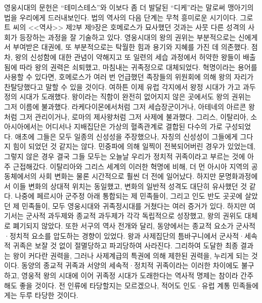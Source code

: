 영웅시대의 문헌은 ``테미스테스''와 이보다 좀 더 발달된 ``디케''라는 말로써
맹아기의 법을 우리에게 드러내보인다.
법의 역사의 다음 단계는 무척 흥미로운 시기이다.
그로트 씨의 <<역사>> 제2부 제9장은 호메로스가 묘사했던 것과는
사뭇 다른 성격의 사회가 등장하는 과정을 잘 기술하고 있다.
영웅시대의 왕의 권위는 부분적으로는 신에게서 부여받은 대권에,
또 부분적으로는 탁월한 힘과 용기와 지혜를 가진 데 의존했다.
점차, 왕의 신성함에 대한 관념이 약해지고 또
일련의 세습 과정에서 허약한 왕들이 배출됨에 따라
왕의 권력은 쇠퇴했고, 마침내는 귀족정으로 대체되었다.
혁명이라는 용어를 사용할 수 있다면,
호메로스가 여러 번 언급했던 족장들의 위원회에 의해
왕의 자리가 찬탈당했다고 말할 수 있을 것이다.
여하튼 이제 유럽 각지에서 왕정 시대가 가고 과두정의 시대가 도래했다.
왕이라는 직함이 완전히 없어지지 않은 곳에서도 왕의 권위는 그저
이름에 불과했다.
라케다이몬에서처럼 그저 세습장군이거나,
아테네의 아르콘 왕처럼 그저 관리이거나,
로마의 제사왕처럼
그저 사제에 불과했다.
그리스, 이탈리아, 소아시아에서는 어디서나
지배집단은 가상의 혈족관계로 결합된 다수의 가로
구성되었다.
애초에 그들은 모두 일종의 신성성을 주장했으나,
자칭의 신성성이 그들에게 그다지 힘이 되었던 것 같지는 않다.
민중파에 의해 일찍이 전복되어버린 경우가 있었는데,
그렇지 않은 경우 결국 그들 모두는
오늘날 우리가 정치적 귀족이라고 부르는 것에 아주 근접해갔다.
이탈리아와 그리스 세계의 이러한 혁명에 비해,
더 먼 아시아 지역의 공동체에서의 사회 변화는
물론 시간적으로 훨씬 더 전에 일어났다.
하지만 문명화과정에서 이들 변화의 상대적 위치는 동일했고,
변화의 일반적 성격도 대단히 유사했던 것 같다.
나중에 페르시아 군주정 아래 통합되는 제 민족들이,
그리고 인도 반도 곳곳에 살았던 제 민족들이,
모두 영웅시대와 귀족정시대를 거쳤다는 여러 증거가 있다.
하지만 여기서는 군사적 과두제와 종교적 과두제가 각각 독립적으로 성장했고,
왕의 권위도 대체로 폐기되지 않았다.
또한 서구의 역사 전개와 달리, 동양에서는
종교적 요소가 군사적^^b7정치적 요소를 압도하는 경향이 있었다.
왕과 사제집단의 틈바구니에서 군사적^^b7세속적 귀족은 보잘 것 없이
절멸당하고 파괴당하여 사라진다.
그리하여 도달한 최종 결과는
왕이 커다란 권력을, 그러나 사제계급의 특권에 의해 제한된 권력을,
누리게 되는 것이다.
동양의 종교적 귀족과 서양의 세속적^^b7정치적 귀족이라는
이러한 차이에도 불구하고,
영웅적 왕의 시대에 이어 귀족정 시대가 도래한다는 역사적 명제는
참이라 간주해도 좋을 것이다.
전 인류에 타당할지는 모르겠으나, 적어도 인도^^b7유럽 계통 민족들에게는
두루 타당한 것이다.

